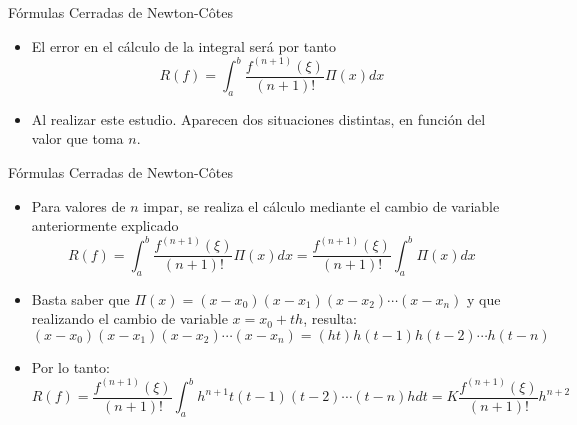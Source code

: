 \documentclass[12pt]{beamer}
\begin{document}
\begin{frame}{F\'ormulas Cerradas de Newton-C\^otes}
  \begin{itemize}
    \item El error en el cálculo de la integral será por tanto
    $$
    R(f) = \int_{a}^{b}\dfrac{f^{(n+1)}(\xi)}{(n+1)!}\Pi(x)dx
    $$
    \item<2-> Al realizar este estudio. Aparecen dos situaciones distintas, en función del valor que toma $n$.
  \end{itemize}
\end{frame}
\begin{frame}{F\'ormulas Cerradas de Newton-C\^otes}
  \begin{itemize}
    \item Para valores de $n$ impar, se realiza el cálculo mediante el cambio de variable anteriormente explicado
    $$
    R(f) = \int_{a}^{b}\dfrac{f^{(n+1)}(\xi)}{(n+1)!}\Pi(x)dx = \dfrac{f^{(n+1)}(\xi)}{(n+1)!}\int_{a}^{b}\Pi(x)dx
    $$
    \item<2-> Basta saber que $\Pi(x) = (x-x_0)(x-x_1)(x-x_2)\cdots(x-x_n)$ y que realizando el cambio de variable $x = x_0 + th$, resulta:
    $$
    (x-x_0)(x-x_1)(x-x_2)\cdots(x-x_n) = (ht)h(t-1)h(t-2)\cdots h(t-n)
    $$
    \item<3-> Por lo tanto:
    \footnotesize{
    $$
    R(f) = \dfrac{f^{(n+1)}(\xi)}{(n+1)!}\int_{a}^{b}h^{n+1}t(t-1)(t-2)\cdots (t-n)hdt = K\dfrac{f^{(n+1)}(\xi)}{(n+1)!}h^{n+2}
    $$}
  \end{itemize}
\end{frame}
\end{document}
